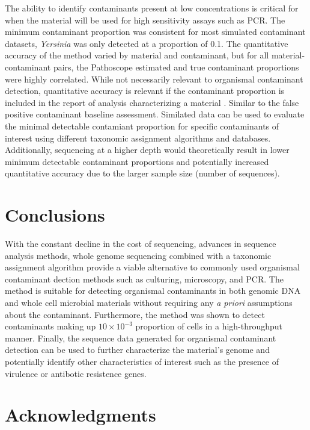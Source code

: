 \documentclass[fleqn,10pt,lineno]{wlpeerj}\usepackage[]{graphicx}\usepackage[]{color}
\begin{document}
The ability to identify contaminants present at low concentrations is critical for when the material will be used for high sensitivity assays such as PCR. 
The minimum contaminant proportion was consistent for most simulated contaminant datasets, \textit{Yersinia} was only detected at a proportion of 0.1. 
The quantitative accuracy of the method varied by material and contaminant, but for all material-contaminant pairs, the Pathoscope estimated and true contaminant proportions were highly correlated. 
While not necessarily relevant to organismal contaminant detection, quantitative accuracy is relevant if the contaminant proportion is included in the report of analysis characterizing a material \citep{olson2016pepr}.  
Similar to the false positive contaminant baseline assessment. 
Similated data can be used to evaluate the minimal detectable contamiant proportion for specific contaminants of interest using different taxonomic assignment algorithms and databases. 
Additionally, sequencing at a higher depth would theoretically result in lower minimum detectable contaminant proportions and potentially increased quantitative accuracy due to the larger sample size (number of sequences).

\section*{Conclusions}
With the constant decline in the cost of sequencing, advances in sequence analysis methods, whole genome sequencing combined with a taxonomic assignment algorithm provide a viable alternative to commonly used organismal contaminant dection methods such as culturing, microscopy, and PCR. 
The method is suitable for detecting organismal contaminants in both genomic DNA and whole cell microbial materials without requiring any \textit{a priori} assumptions about the contaminant. 
Furthermore, the method was shown to detect contaminants making up $10 \times 10^{-3}$ proportion of cells in a high-throughput manner. 
Finally, the sequence data generated for organismal contaminant detection can be used to further characterize the material's genome and potentially identify other characteristics of interest such as the presence of virulence or antibotic resistence genes. 

\newpage

\section*{Acknowledgments}
\end{document}
